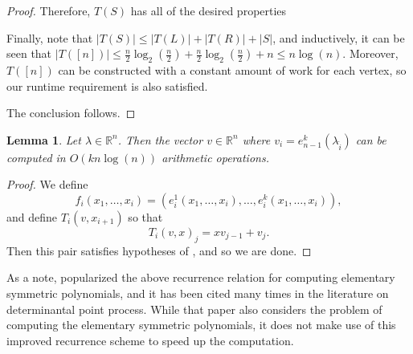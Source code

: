 \documentclass{amsart}
\newtheorem{lemma}[theorem]{Lemma}
\theoremstyle{definition}
\newcommand{\R}{\mathbb{R}}
\begin{document}
\begin{proof}
    Therefore, $T(S)$ has all of the desired properties

    Finally, note that $|T(S)| \le |T(L)| + |T(R)| + |S|$, and inductively, it can be seen that $|T([n])| \le \frac{n}{2}\log_2(\frac{n}{2}) +  \frac{n}{2}\log_2(\frac{n}{2}) + n \le n\log(n)$. Moreover, $T([n])$ can be constructed with a constant amount of work for each vertex, so our runtime requirement is also satisfied.

    The conclusion follows.
\end{proof}

\begin{lemma}
    Let $\lambda \in \R^n$. Then the vector $v \in \R^n$ where $v_i = e^{k}_{n-1}(\lambda_{\hat{i}})$ can be computed in $O(kn\log(n))$ arithmetic operations.
\end{lemma}
\begin{proof}
    We define
    \[
        f_i(x_1 ,\dots, x_i) = (e_i^1(x_1 ,\dots, x_i) ,\dots, e_i^k(x_1 ,\dots, x_i)),
    \]
    and define $T_i(v, x_{i+1})$ so that
    \[
        T_i(v, x)_j = xv_{j-1} + v_j.
    \]
    Then this pair satisfies hypotheses of , and so we are done.
\end{proof}

As a note,  popularized the above recurrence relation for computing elementary symmetric polynomials, and it has been cited many times in the literature on determinantal point process.
While that paper also considers the problem of computing the elementary symmetric polynomials, it does not make use of this improved recurrence scheme to speed up the computation.
\end{document}
